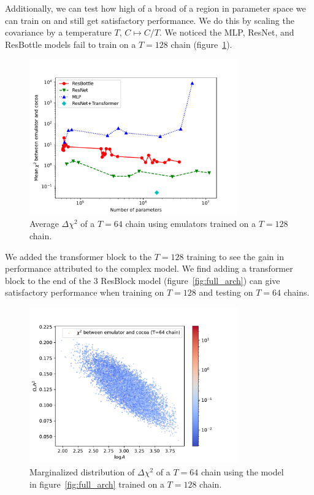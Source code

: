 Additionally, we can test how high of a broad of a region in parameter space we can train on and still get satisfactory performance. We do this by scaling the covariance by a temperature $T$, $C\mapsto C/T$. We noticed the MLP, ResNet, and ResBottle models fail to train on a $T=128$ chain (figure~\ref{fig:avg_chi2_nparams_t128}).
\begin{figure}[!tb]
	\centering
	\includegraphics[width=0.8\textwidth]{plots/avg_chi2_v_n_params_T64.pdf}
	\caption{Average $\Delta\chi^2$ of a $T=64$ chain using emulators trained on a $T=128$ chain.}
	\label{fig:avg_chi2_nparams_t128}
\end{figure} 
We added the transformer block to the $T=128$ training to see the gain in performance attributed to the complex model. We find adding a transformer block to the end of the 3 ResBlock model (figure~\ref{fig:full_arch}) can give satisfactory performance when training on $T=128$ and testing on $T=64$ chains.
\begin{figure}[!tb]
	\centering
	\includegraphics[width=0.8\textwidth]{plots/T64_attention_stuff.pdf}
	\caption{Marginalized distribution of $\Delta\chi^2$ of a $T=64$ chain using the model in figure~\ref{fig:full_arch} trained on a $T=128$ chain.}
	\label{fig:testing_attention_t128}
\end{figure}

